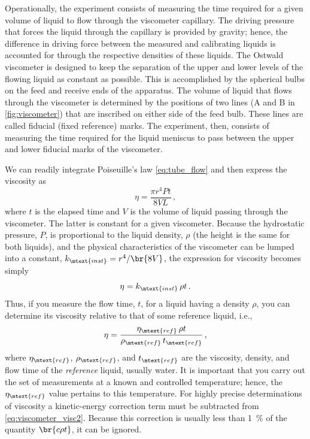 \documentclass[nobib,nofonts,nols,nohyper]{tufte-handout}
\begin{document}
Operationally, the experiment consists of measuring the time required for a given volume of liquid to flow through the viscometer capillary. 
The driving pressure that forces the liquid through the capillary is provided by gravity; hence, the difference in driving force between the measured and calibrating liquids is accounted for through the respective densities of these liquids. 
The Ostwald viscometer is designed to keep the separation of the upper and lower levels of the flowing liquid as constant as possible. 
This is accomplished by the spherical bulbs on the feed and receive ends of the apparatus. 
The volume of liquid that flows through the viscometer is determined by the positions of two lines (A and B in \cref{fig:viscometer}) that are inscribed on either side of the feed bulb. 
These lines are called fiducial (fixed reference) marks. 
The experiment, then, consists of measuring the time required for the liquid meniscus to pass between the upper and lower fiducial marks of the viscometer.

We can readily integrate Poiseuille's law \cref{eq:tube_flow} and then express the viscosity as
\begin{equation}
	\eta = \frac{\pi r^4 P t}{8 V L} \, ,
	\label{eq:viscometer_visc1}
\end{equation}
where \( t \) is the elapsed time and \( V \) is the volume of liquid passing through the viscometer. 
The latter is constant for a given viscometer. 
Because the hydrostatic pressure, \( P \), is proportional to the liquid density, \( \rho \) (the height is the same for both liquids), and the physical characteristics of the viscometer can be lumped into a constant, \( k_\mtext{inst} = r^4/\br{8 V} \), the expression for viscosity becomes simply
\begin{equation}
	\eta = k_\mtext{inst}\, \rho t \, .
	\label{eq:viscometer_visc2}
\end{equation}
Thus, if you measure the flow time, \( t \), for a liquid having a density \( \rho \), you can determine its viscosity relative to that of some reference liquid, i.e.,
\begin{equation}
	\eta = \frac{\eta_\mtext{ref} \, \rho t}{\rho_\mtext{ref} \, t_\mtext{ref}} \, ,
	\label{eq:ref_viscosity}
\end{equation}
where \( \eta_\mtext{ref} \), \( \rho_\mtext{ref} \), and \( t_\mtext{ref} \) are the viscosity, density, and flow time of the \emph{reference} liquid, usually water. 
It is important that you carry out the set of measurements at a known and controlled temperature; hence, the \( \eta_\mtext{ref} \) value pertains to this temperature. 
For highly precise determinations of viscosity a kinetic-energy correction term must be subtracted from \cref{eq:viscometer_visc2}. 
Because this correction is usually less than \qty{1}{\percent} of the quantity \( \br{c \rho t} \), it can be ignored.
\end{document}
